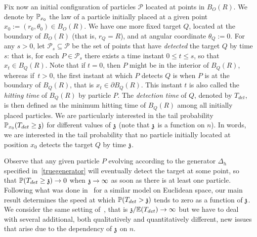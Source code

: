 Fix now an initial configuration of particles $\mathcal{P}$ located at points in $B_O(R)$. 
We denote by $\PP_{x_0}$ the law of a particle initially placed at a given point $x_0:=(r_0, \theta_0)\in B_O(R)$. 
We have one more fixed target $Q$, located at the boundary of $B_O(R)$ (that is, $r_Q=R$), and at angular coordinate $\theta_Q:=0$.
For any $s>0$, let  $\mathcal{P}_s\subseteq\mathcal{P}$ be the set of points that have \emph{detected} the target $Q$ by time $s$: that is, for each $P \in \mathcal{P}_s$ there exists a time instant $0 \le t \le s$, so that $x_t \in B_{Q}(R)$. Note that if $t=0$, then $P$ might be in the interior of $B_Q(R)$, whereas if~$t > 0$, the first instant at which $P$ detects $Q$ is when $P$ is at the boundary of $B_Q(R)$, that is $x_t\in\partial B_Q(R)$. This instant $t$ is also called the \emph{hitting time} of $B_Q(R)$ by particle $P$. %
The \emph{detection time} of $Q$, denoted by $T_{det}$, is then defined as the minimum hitting time of  $B_{Q}(R)$ among all initially placed particles. We are particularly interested in the tail probability
$
\PP_{x_0}(T_{det}\ge\ss)
$
for different values of $\ss$ (note that $\ss$ is a function on $n$). In words, we are interested in the tail probability that no particle initially located at position $x_0$ detects the target $Q$ by time $\ss$.

Observe that any given particle $P$ evolving according to the generator $\Delta_h$ specified in~\eqref{truegenerator} will eventually detect the target at some point, so that $\PP(T_{det}\ge\ss)\to 0$ when $\ss\to\infty$ as soon as there is at least one particle. Following what was done in~\cite{Peres2010} for a similar model on Euclidean space, our main result determines the speed at which $\PP(T_{det}>\ss)$ tends to zero as a function of $\ss$.
We consider the same setting of~\cite{Peres2010}, that is $\ss/\EE(T_{det})\to \infty$ but we have to deal with several additional, both qualitatively and quantitatively different, new issues that arise due to the dependency 
of $\ss$ on $n$.

